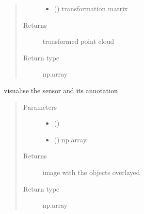 \documentclass[letterpaper,10pt,english]{sphinxmanual}
\begin{document}
\begin{fulllineitems}
\begin{fulllineitems}
\begin{quote}
\begin{description}
\begin{itemize}
\item {} 
 () \textendash{} transformation matrix

\end{itemize}

\item[{Returns}] \leavevmode
transformed point cloud

\item[{Return type}] \leavevmode
np.array

\end{description}\end{quote}

\end{fulllineitems}


\begin{fulllineitems}
\label{\detokenize{radiate:radiate.Sequence.vis}}
visualise the sensor and its annotation
\begin{quote}\begin{description}
\item[{Parameters}] \leavevmode\begin{itemize}
\item {} 
 () \textendash{} 

\item {} 
 () \textendash{} np.array

\end{itemize}

\item[{Returns}] \leavevmode
image with the objects overlayed

\item[{Return type}] \leavevmode
np.array

\end{description}\end{quote}

\end{fulllineitems}



\end{fulllineitems}
\end{document}
